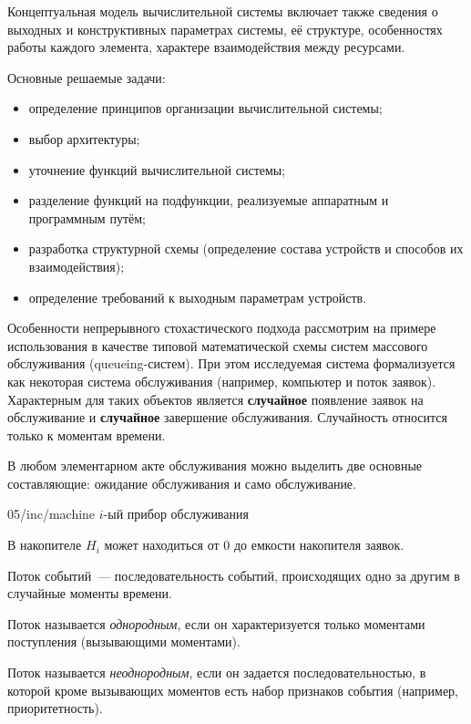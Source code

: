 Концептуальная модель вычислительной системы включает также сведения о выходных и конструктивных параметрах системы, её структуре, особенностях работы каждого элемента, характере взаимодействия между ресурсами.

Основные решаемые задачи:

\begin{itemize}
    \item определение принципов организации вычислительной системы;
    \item выбор архитектуры;
    \item уточнение функций вычислительной системы;
    \item разделение функций на подфункции, реализуемые аппаратным и программным путём;
    \item разработка структурной схемы (определение состава устройств и способов их взаимодействия);
    \item определение требований к выходным параметрам устройств.
\end{itemize}

Особенности непрерывного стохастического подхода рассмотрим на примере использования в качестве типовой математической схемы систем массового обслуживания (queueing-систем). При этом исследуемая система формализуется как некоторая система обслуживания (например, компьютер и поток заявок). Характерным для таких объектов является \textbf{случайное} появление заявок на обслуживание и \textbf{случайное} завершение обслуживания. Случайность относится только к моментам времени.

В любом элементарном акте обслуживания можно выделить две основные составляющие: ожидание обслуживания и само обслуживание.

\image
{\textwidth}
{05/inc/machine}
{$i$-ый прибор обслуживания}

В накопителе $H_i$ может находиться от $0$ до емкости накопителя заявок.

\begin{dd}
    Поток событий~--- последовательность событий, происходящих одно за другим в случайные моменты времени.
\end{dd}

\begin{dd}
    Поток называется \textit{однородным}, если он характеризуется только моментами поступления (вызывающими моментами).
\end{dd}

\begin{dd}
    Поток называется \textit{неоднородным}, если он задается последовательностью, в которой кроме вызывающих моментов есть набор признаков события (например, приоритетность).
\end{dd}

